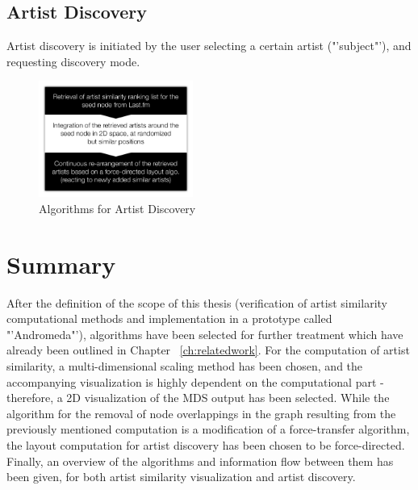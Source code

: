 \subsection{Artist Discovery}

Artist discovery is initiated by the user selecting a certain artist ("'subject"'), and requesting discovery mode.

\begin{figure}[H]
  \centering
    \includegraphics[width=0.45\textwidth]{figures/algorithm_flow_artist_discovery}
  \caption{Algorithms for Artist Discovery}
  \label{fig:algorithm_flow_artist_discovery}
\end{figure}

\section{Summary}

After the definition of the scope of this thesis (verification of artist similarity computational methods and implementation in a prototype called "'Andromeda"'), algorithms have been selected for further treatment which have already been outlined in Chapter ~\ref{ch:relatedwork}. For the computation of artist similarity, a multi-dimensional scaling method has been chosen, and the accompanying visualization is highly dependent on the computational part - therefore, a 2D visualization of the MDS output has been selected. 
While the algorithm for the removal of node overlappings in the graph resulting from the previously mentioned computation is a modification of a force-transfer algorithm, the layout computation for artist discovery has been chosen to be force-directed. Finally, an overview of the algorithms and information flow between them has been given, for both artist similarity visualization and artist discovery.